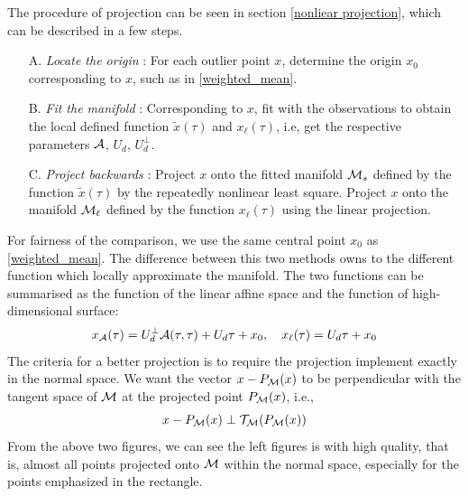 \documentclass[aos,preprint]{imsart}
\theoremstyle{remark}
\begin{document}
The procedure of projection can be seen in section \ref{nonliear projection}, which can be described in a few steps.
\begin{itemize}
\item[A. {\it Locate the origin}]: For each outlier point $x$, determine the origin $x_0$ corresponding to $x$, such as in \eqref{weighted_mean}.
\item[B. {\it Fit the manifold}]: Corresponding to $x$, fit  with the observations to obtain the local defined function $\tilde{x}(\tau)$ and $x_\ell(\tau)$, i.e, get the respective parameters $\cal A$, $U_d$, $U_d^\perp$.
\item[C. {\it Project backwards}]: Project $x$ onto the fitted manifold ${\cal M}_s$ defined by the function $\tilde{x}(\tau)$ by the repeatedly nonlinear least square. Project $x$ onto the manifold ${\cal M}_\ell$ defined by the function $x_\ell(\tau)$ using the linear projection.
\end{itemize}
For fairness of the comparison, we use the same central point $x_0$ as \eqref{weighted_mean}. The difference between this two methods owns to the different function which locally approximate the manifold. The two functions can be summarised as the function of the linear affine space and the function of high-dimensional surface:
\[
{x}_{\cal A}(\tau) = U_{d}^{\perp} {\cal A} (\tau, \tau) + U_d \tau +x_0, \quad x_\ell(\tau) =  U_d \tau +x_0
\]
The criteria for a better projection is to require the projection implement exactly in the normal space. %
We want the vector $x-P_{{\cal M}}(x)$ to be perpendicular with the tangent space of $\cal M$ at the projected point $P_{{\cal M}}(x)$, i.e., 
\[
x-P_{{\cal M}}(x)\perp {\cal T}_{\cal M} (P_{{\cal M}}(x))
\]
From the above two figures, we can see the left figures is with high quality, that is, almost all points projected onto $\cal M$ within the normal space, especially for the points emphasized in the rectangle.
\end{document}
